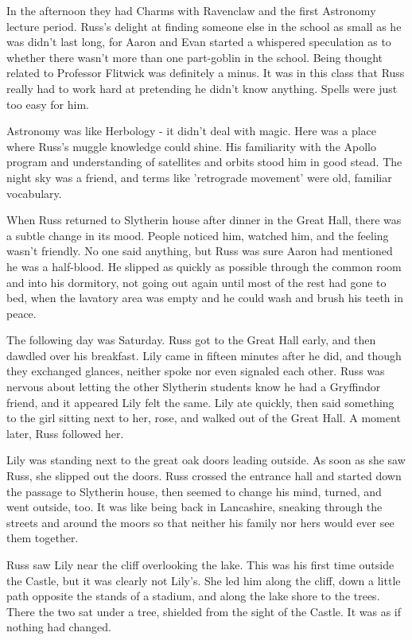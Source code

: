 \documentclass[a4paper,11pt]{article}
\begin{document}
In the afternoon they had Charms with Ravenclaw and the first Astronomy lecture period. Russ's delight at finding someone else in the school as small as he was didn't last long, for Aaron and Evan started a whispered speculation as to whether there wasn't more than one part-goblin in the school. Being thought related to Professor Flitwick was definitely a minus. It was in this class that Russ really had to work hard at pretending he didn't know anything. Spells were just too easy for him.

Astronomy was like Herbology - it didn't deal with magic. Here was a place where Russ's muggle knowledge could shine. His familiarity with the Apollo program and understanding of satellites and orbits stood him in good stead. The night sky was a friend, and terms like 'retrograde movement' were old, familiar vocabulary.

When Russ returned to Slytherin house after dinner in the Great Hall, there was a subtle change in its mood. People noticed him, watched him, and the feeling wasn't friendly. No one said anything, but Russ was sure Aaron had mentioned he was a half-blood. He slipped as quickly as possible through the common room and into his dormitory, not going out again until most of the rest had gone to bed, when the lavatory area was empty and he could wash and brush his teeth in peace.

The following day was Saturday. Russ got to the Great Hall early, and then dawdled over his breakfast. Lily came in fifteen minutes after he did, and though they exchanged glances, neither spoke nor even signaled each other. Russ was nervous about letting the other Slytherin students know he had a Gryffindor friend, and it appeared Lily felt the same. Lily ate quickly, then said something to the girl sitting next to her, rose, and walked out of the Great Hall. A moment later, Russ followed her.

Lily was standing next to the great oak doors leading outside. As soon as she saw Russ, she slipped out the doors. Russ crossed the entrance hall and started down the passage to Slytherin house, then seemed to change his mind, turned, and went outside, too. It was like being back in Lancashire, sneaking through the streets and around the moors so that neither his family nor hers would ever see them together.

Russ saw Lily near the cliff overlooking the lake. This was his first time outside the Castle, but it was clearly not Lily's. She led him along the cliff, down a little path opposite the stands of a stadium, and along the lake shore to the trees. There the two sat under a tree, shielded from the sight of the Castle. It was as if nothing had changed.
\end{document}
